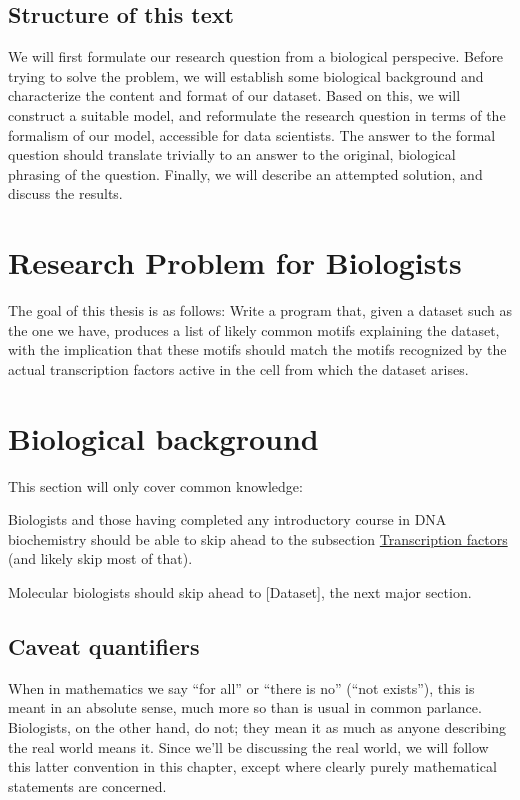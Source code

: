 \documentclass[fleqn]{book}
\begin{document}
\section{Structure of this text}\label{structure-of-this-text}

We will first formulate our research question from a biological
perspecive. Before trying to solve the problem, we will establish some
biological background and characterize the content and format of our
dataset. Based on this, we will construct a suitable model, and
reformulate the research question in terms of the formalism of our
model, accessible for data scientists. The answer to the formal question
should translate trivially to an answer to the original, biological
phrasing of the question. Finally, we will describe an attempted
solution, and discuss the results.

\chapter{Research Problem for
Biologists}\label{research-problem-for-biologists}

The goal of this thesis is as follows: Write a program that, given a
dataset such as the one we have, produces a list of likely common motifs
explaining the dataset, with the implication that these motifs should
match the motifs recognized by the actual transcription factors active
in the cell from which the dataset arises.

\chapter{Biological background}\label{biological-background}

This section will only cover common knowledge:

Biologists and those having completed any introductory course in DNA
biochemistry should be able to skip ahead to the subsection
\protect\hyperlink{transcription-factors-1}{Transcription factors} (and
likely skip most of that).

Molecular biologists should skip ahead to {[}Dataset{]}, the next major
section.

\section{Caveat quantifiers}\label{caveat-quantifiers}

When in mathematics we say ``for all'' or ``there is no'' (``not
exists''), this is meant in an absolute sense, much more so than is
usual in common parlance. Biologists, on the other hand, do not; they
mean it as much as anyone describing the real world means it. Since
we'll be discussing the real world, we will follow this latter
convention in this chapter, except where clearly purely mathematical
statements are concerned.
\end{document}
